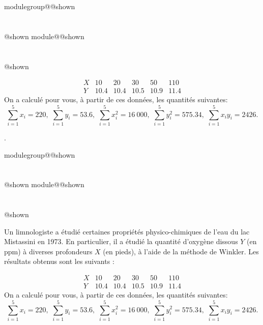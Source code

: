 \documentclass{Evaluation}
\makeatletter
\newcommand{\currentmodulekey}{}
\newcommand{\currentmoduletitle}{}
\newcommand{\currentgroupkey}{}
\newcommand{\currentgrouptitle}{}
\newcommand{\showmoduleifneeded}{%
  \ifx\currentgroupkey\empty\else
    \expandafter\ifx\csname modulegroup@\currentgroupkey @shown\endcsname\relax
      \section*{\currentgrouptitle}%
      \expandafter\gdef\csname modulegroup@\currentgroupkey @shown\endcsname{1}%
    \fi
  \fi
  \expandafter\ifx\csname module@\currentmodulekey @shown\endcsname\relax
    \section*{\currentmoduletitle}%
    \expandafter\gdef\csname module@\currentmodulekey @shown\endcsname{1}%
  \fi
}
\newenvironment{A24}{\showmoduleifneeded}{}
\newenvironment{A25}{\showmoduleifneeded}{}
\makeatother
\begin{document}
\begin{questions}
\begin{A24}
$$
\begin{array}{c|ccccc}
X & 10 & 20 & 30 & 50 & 110   \\  \hline
Y & 10.4 & 10.4 & 10.5 & 10.9 & 11.4
\end{array}
$$
On a calculé pour vous, à partir de ces données, les quantités suivantes:
$$
\sum_{i=1}^{5} x_i  = 220,\,\,  \sum_{i=1}^{5} y_i  = 53.6,\,\,
 \sum_{i=1}^{5} x_i^2  = 16\ 000,\,\,  \sum_{i=1}^{5} y_i^2  = 575.34,\,\,  \sum_{i=1}^{5} x_iy_i  = 2426.
$$

.
\end{A24}

\begin{A25}
\question {} %
\label{A25-F9-reglin}
Un limnologiste a étudié certaines propriétés physico-chimiques de l'eau du lac Mistassini en 1973. En particulier, il a étudié la quantité d'oxygène dissous $Y$ (en ppm) à diverses profondeurs $X$ (en pieds), à l'aide de la méthode de Winkler. Les résultats obtenus sont les suivants :

$$
\begin{array}{c|ccccc}
X & 10 & 20 & 30 & 50 & 110   \\  \hline
Y & 10.4 & 10.4 & 10.5 & 10.9 & 11.4
\end{array}
$$
On a calculé pour vous, à partir de ces données, les quantités suivantes:
$$
\sum_{i=1}^{5} x_i  = 220,\,\,  \sum_{i=1}^{5} y_i  = 53.6,\,\,
 \sum_{i=1}^{5} x_i^2  = 16\ 000,\,\,  \sum_{i=1}^{5} y_i^2  = 575.34,\,\,  \sum_{i=1}^{5} x_iy_i  = 2426.
$$\begin{parts}

\end{parts}
\end{A25}
\end{questions}
\end{document}
